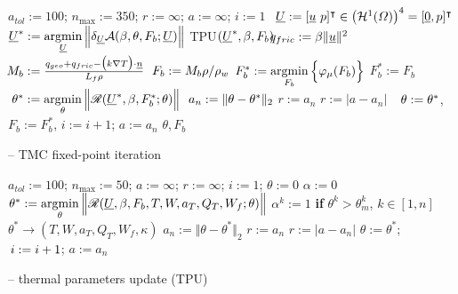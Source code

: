 \begin{algorithm}
  \begin{algorithmic}[1] 
      \State $a_{tol} := 100$; $n_{\max} := 350$; $r := \infty$; $a := \infty$; $i := 1$
        \State $\phantom{F_b^*}\mathllap{\rankone{U}} := [\rankone{u}\ p]^{\intercal} \in \left( \mathcal{H}^1(\Omega) \right)^4 = [\rankone{0}, p]^{\intercal}$
        \State $\phantom{F_b^*}\mathllap{\rankone{U}^*} := \argminl_{\rankone{U}} \Big\Vert \delta_{\rankone{U}} \mathcal{A}(\beta, \theta, F_b; \rankone{U}) \Big\Vert$
        \State TPU$(\underline{U}^*, \beta, F_b)$
        \State $\phantom{F_b^*}\mathllap{q_{fric}} := \beta \Vert \rankone{u} \Vert^2$
        \State $\phantom{F_b^*}\mathllap{M_b} := \frac{q_{geo} + q_{fric} - \big( k \nabla T \big) \cdot \rankone{n}}{L_f \rho}$
        \State $\phantom{F_b^*}\mathllap{F_b} := M_b \rho / \rho_w$
          \State $F_b^* := \operatorname*{argmin}\limits_{F_b} \Big\{ \varphi_{\mu}(F_b) \Big\}$
        \Else
          \State $F_b^* := F_b$
        \EndIf
        \State $\phantom{F_b^*}\mathllap{\theta^*} := \argminl_{\theta} \Big\Vert \mathscr{R}(\rankone{U}^*, \beta, F_b^*; \theta) \Big\Vert$
        \State $\phantom{F_b^*}\mathllap{a_n} := \Vert \theta - \theta^* \Vert_{2}$
          \State $r := a_n$
        \Else
          \State $r := |a - a_n|$
        \EndIf
        \State $\phantom{F_b^*}\mathllap{\theta} := \theta^*$, $F_b := F_b^*$, $i := i + 1$; $a := a_n$
      \EndWhile
    \State \Return $\theta, F_b$
    \EndFunction
  \end{algorithmic}
  \caption[Thermo-mechanical coupling]{ -- TMC fixed-point iteration}
  \label{tmc}
\end{algorithm}

\begin{algorithm}
  \begin{algorithmic}[1] 
      \State $a_{tol} := 100$; $n_{\max} := 50$; $a := \infty$; $r := \infty$; $i := 1$; $\theta := 0$
      \State $\alpha := 0$
        \State $\theta^* := \operatorname*{argmin}\limits_{\theta} \Big\Vert \mathscr{R}(\underline{U}, \beta, F_b, T, W, a_T, Q_T, W_f; \theta) \Big\Vert$
        \State $\alpha^k := 1$ \textbf{if} $\theta^k > \theta_m^k$, $k \in [1,n]$
        \EndIf
        \State $\theta^* \rightarrow (T,W, a_T, Q_T, W_f, \kappa)$
        \State $a_n := \Vert \theta - \theta^* \Vert_{2}$
          \State $r := a_n$
        \Else
          \State $r := |a - a_n|$
        \EndIf
        \State $\theta := \theta^*$; $\phantom{\theta}\mathllap{i} := i + 1$; $a := a_n$
      \EndWhile
    \EndFunction
  \end{algorithmic}
  \caption[Thermal-parameters update]{ -- thermal parameters update (TPU)}
  \label{tpu}
\end{algorithm}

